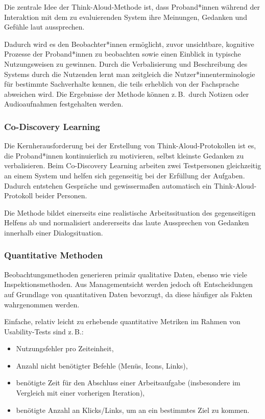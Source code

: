 \documentclass[
  11pt,
  letterpaper,
  DIV=11,
  twoside]{scrreprt}
\begin{document}
Die zentrale Idee der Think-Aloud-Methode ist, dass Proband*innen
während der Interaktion mit dem zu evaluierenden System ihre Meinungen,
Gedanken und Gefühle laut aussprechen.

Dadurch wird es den Beobachter*innen ermöglicht, zuvor unsichtbare,
kognitive Prozesse der Proband*innen zu beobachten sowie einen Einblick
in typische Nutzungsweisen zu gewinnen. Durch die Verbalisierung und
Beschreibung des Systems durch die Nutzenden lernt man zeitgleich die
Nutzer*innenterminologie für bestimmte Sachverhalte kennen, die teils
erheblich von der Fachsprache abweichen wird. Die Ergebnisse der Methode
können z.\,B.~durch Notizen oder Audioaufnahmen festgehalten werden.

\subsubsection{Co-Discovery Learning}\label{co-discovery-learning}

Die Kernherausforderung bei der Erstellung von Think-Aloud-Protokollen
ist es, die Proband*innen kontinuierlich zu motivieren, selbst kleinste
Gedanken zu verbalisieren. Beim Co-Discovery Learning arbeiten zwei
Testpersonen gleichzeitig an einem System und helfen sich gegenseitig
bei der Erfüllung der Aufgaben. Dadurch entstehen Gespräche und
gewissermaßen automatisch ein Think-Aloud-Protokoll beider Personen.

Die Methode bildet einerseits eine realistische Arbeitssituation des
gegenseitigen Helfens ab und normalisiert andererseits das laute
Aussprechen von Gedanken innerhalb einer Dialogsituation.

\subsubsection{Quantitative Methoden}\label{quantitative-methoden}

Beobachtungsmethoden generieren primär qualitative Daten, ebenso wie
viele Inspektionsmethoden. Aus Managementsicht werden jedoch oft
Entscheidungen auf Grundlage von quantitativen Daten bevorzugt, da diese
häufiger als Fakten wahrgenommen werden.

Einfache, relativ leicht zu erhebende quantitative Metriken im Rahmen
von Usability-Tests sind z.\,B.:

\begin{itemize}
\item
  Nutzungsfehler pro Zeiteinheit,
\item
  Anzahl nicht benötigter Befehle (Menüs, Icons, Links),
\item
  benötigte Zeit für den Abschluss einer Arbeitsaufgabe (insbesondere im
  Vergleich mit einer vorherigen Iteration),
\item
  benötigte Anzahl an Klicks/Links, um an ein bestimmtes Ziel zu kommen.
\end{itemize}
\end{document}
